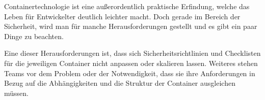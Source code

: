 
Containertechnologie ist eine außerordentlich praktische Erfindung, welche das Leben für Entwickelter deutlich leichter macht. Doch gerade im Bereich der Sicherheit, wird man für manche Herausforderungen gestellt und es gibt ein paar Dinge zu beachten.

Eine dieser Herausforderungen ist, dass sich Sicherheitsrichtlinien und Checklisten für die jeweiligen Container nicht anpassen oder skalieren lassen. Weiteres stehen Teams vor dem Problem oder der Notwendigkeit, dass sie ihre Anforderungen in Bezug auf die Abhängigkeiten und die Struktur der Container ausgleichen müssen. \cite{ContainerSecurity}
